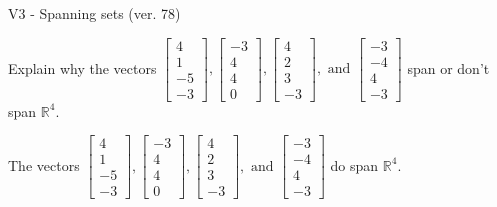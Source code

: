 \begin{exercise}
  \begin{exerciseTitle}V3 - Spanning sets (ver. 78)\end{exerciseTitle}
  \begin{exerciseStatement}
    Explain why the vectors \(\left[\begin{array}{r}
4 \\
1 \\
-5 \\
-3
\end{array}\right] , \left[\begin{array}{r}
-3 \\
4 \\
4 \\
0
\end{array}\right] , \left[\begin{array}{r}
4 \\
2 \\
3 \\
-3
\end{array}\right] , \text{ and } \left[\begin{array}{r}
-3 \\
-4 \\
4 \\
-3
\end{array}\right]\) span or don't span \(\mathbb{R}^4\). 
	


  \end{exerciseStatement}
  \begin{exerciseAnswer}
   The vectors \(\left[\begin{array}{r}
4 \\
1 \\
-5 \\
-3
\end{array}\right] , \left[\begin{array}{r}
-3 \\
4 \\
4 \\
0
\end{array}\right] , \left[\begin{array}{r}
4 \\
2 \\
3 \\
-3
\end{array}\right] , \text{ and } \left[\begin{array}{r}
-3 \\
-4 \\
4 \\
-3
\end{array}\right]\) 
  	 do  
	span \(\mathbb{R}^4\).
  


  \end{exerciseAnswer}
\end{exercise}